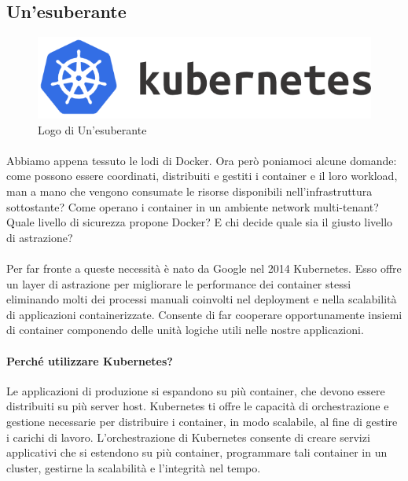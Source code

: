 \subsection{Un'esuberante}
\begin{figure}[h!]
	\centering
	\includegraphics[width=\textwidth,keepaspectratio=true]{capitoli/imgs/kubernetes_full.png}
	\caption{Logo di Un'esuberante}
\end{figure}

\paragraph{}
Abbiamo appena tessuto le lodi di Docker. Ora però poniamoci alcune domande: come possono essere coordinati, distribuiti e gestiti i container e il loro workload, man a mano che vengono consumate le risorse disponibili nell'infrastruttura sottostante? Come operano i container in un ambiente network multi-tenant? Quale livello di sicurezza propone Docker? E chi decide quale sia il giusto livello di astrazione?

\paragraph{}
Per far fronte a queste necessità è nato da Google nel 2014 Kubernetes. Esso offre un layer di astrazione per migliorare le performance dei container stessi eliminando molti dei processi manuali coinvolti nel deployment e nella scalabilità di applicazioni containerizzate. Consente di far cooperare opportunamente insiemi di container componendo delle unità logiche utili nelle nostre applicazioni.

\paragraph{Perché utilizzare Kubernetes?}
Le applicazioni di produzione si espandono su più container, che devono essere distribuiti su più server host. Kubernetes ti offre le capacità di orchestrazione e gestione necessarie per distribuire i container, in modo scalabile, al fine di gestire i carichi di lavoro. L'orchestrazione di Kubernetes consente di creare servizi applicativi che si estendono su più container, programmare tali container in un cluster, gestirne la scalabilità e l'integrità nel tempo.

